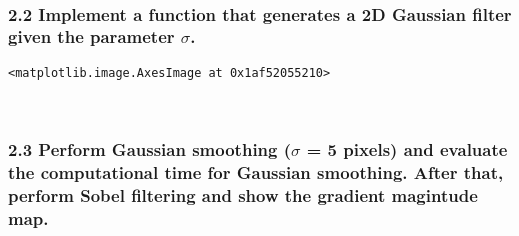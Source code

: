 \documentclass[11pt]{article}
\begin{document}
    \begin{center}
    \end{center}
    { \hspace*{\fill} \\}
    
    \hypertarget{implement-a-function-that-generates-a-2d-gaussian-filter-given-the-parameter-sigma.}{%
\subsubsection{\texorpdfstring{2.2 Implement a function that generates a
2D Gaussian filter given the parameter
\(\sigma\).}{2.2 Implement a function that generates a 2D Gaussian filter given the parameter \textbackslash sigma.}}\label{implement-a-function-that-generates-a-2d-gaussian-filter-given-the-parameter-sigma.}}

            \begin{tcolorbox}[breakable, size=fbox, boxrule=.5pt, pad at break*=1mm, opacityfill=0]
\begin{Verbatim}[commandchars=\\\{\}]
<matplotlib.image.AxesImage at 0x1af52055210>
\end{Verbatim}
\end{tcolorbox}
        
    \begin{center}
    \end{center}
    { \hspace*{\fill} \\}
    
    \hypertarget{perform-gaussian-smoothing-sigma-5-pixels-and-evaluate-the-computational-time-for-gaussian-smoothing.-after-that-perform-sobel-filtering-and-show-the-gradient-magintude-map.}{%
\subsubsection{\texorpdfstring{2.3 Perform Gaussian smoothing
(\(\sigma\) = 5 pixels) and evaluate the computational time for Gaussian
smoothing. After that, perform Sobel filtering and show the gradient
magintude
map.}{2.3 Perform Gaussian smoothing (\textbackslash sigma = 5 pixels) and evaluate the computational time for Gaussian smoothing. After that, perform Sobel filtering and show the gradient magintude map.}}\label{perform-gaussian-smoothing-sigma-5-pixels-and-evaluate-the-computational-time-for-gaussian-smoothing.-after-that-perform-sobel-filtering-and-show-the-gradient-magintude-map.}}
\end{document}
